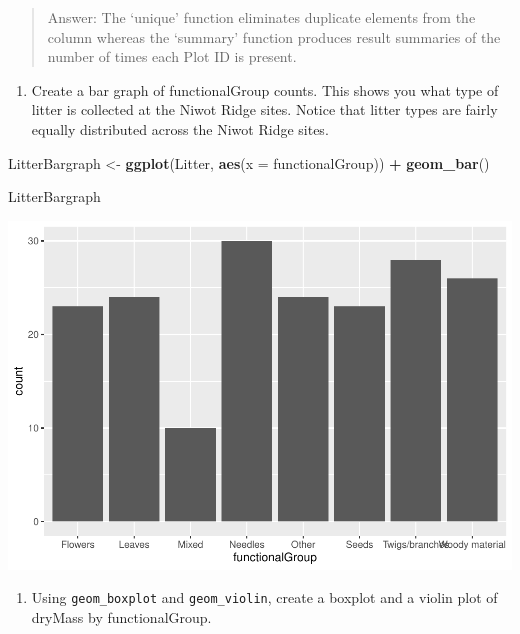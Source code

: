\documentclass[]{article}
\newenvironment{Shaded}{\begin{snugshade}}{\end{snugshade}}
\newcommand{\KeywordTok}[1]{\textcolor[rgb]{0.13,0.29,0.53}{\textbf{#1}}}
\newcommand{\DataTypeTok}[1]{\textcolor[rgb]{0.13,0.29,0.53}{#1}}
\newcommand{\StringTok}[1]{\textcolor[rgb]{0.31,0.60,0.02}{#1}}
\newcommand{\OperatorTok}[1]{\textcolor[rgb]{0.81,0.36,0.00}{\textbf{#1}}}
\newcommand{\NormalTok}[1]{#1}
\providecommand{\tightlist}{%
  \setlength{\itemsep}{0pt}\setlength{\parskip}{0pt}}
\begin{document}
\begin{quote}
Answer: The `unique' function eliminates duplicate elements from the
column whereas the `summary' function produces result summaries of the
number of times each Plot ID is present.
\end{quote}

\begin{enumerate}
\def\labelenumi{\arabic{enumi}.}
\setcounter{enumi}{13}
\tightlist
\item
  Create a bar graph of functionalGroup counts. This shows you what type
  of litter is collected at the Niwot Ridge sites. Notice that litter
  types are fairly equally distributed across the Niwot Ridge sites.
\end{enumerate}

\begin{Shaded}
\begin{Highlighting}[]
\NormalTok{LitterBargraph <-}\StringTok{ }\KeywordTok{ggplot}\NormalTok{(Litter, }\KeywordTok{aes}\NormalTok{(}\DataTypeTok{x =}\NormalTok{ functionalGroup)) }\OperatorTok{+}
\StringTok{  }\KeywordTok{geom_bar}\NormalTok{()}

\NormalTok{LitterBargraph}
\end{Highlighting}
\end{Shaded}

\includegraphics{A03_DataExploration_files/figure-latex/unnamed-chunk-11-1.pdf}

\begin{enumerate}
\def\labelenumi{\arabic{enumi}.}
\setcounter{enumi}{14}
\tightlist
\item
  Using \texttt{geom\_boxplot} and \texttt{geom\_violin}, create a
  boxplot and a violin plot of dryMass by functionalGroup.
\end{enumerate}
\end{document}
